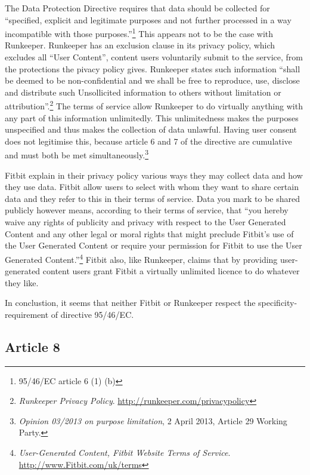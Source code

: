 \documentclass{article}
\begin{document}
The Data Protection Directive requires that data should be collected for ``specified, explicit and legitimate purposes and not further processed in a way incompatible with those purposes.''\footnote{95/46/EC article 6 (1) (b)}
This appears not to be the case with Runkeeper.
Runkeeper has an exclusion clause in its privacy policy, which excludes all ``User Content'', content users voluntarily submit to the service, from the protections the pivacy policy gives.
Runkeeper states such information ``shall be deemed to be non-confidential and we shall be free to reproduce, use, disclose and distribute such Unsollicited information to others without limitation or attribution''.\footnote{\emph{Runkeeper Privacy Policy}. \url{http://runkeeper.com/privacypolicy}}
The terms of service allow Runkeeper to do virtually anything with any part of this information unlimitedly.
This unlimitedness makes the purposes unspecified and thus makes the collection of data unlawful. Having user consent does not legitimise this, because article 6 and 7 of the directive are cumulative and must both be met simultaneously.\footnote{\emph{Opinion 03/2013 on purpose limitation}, 2 April 2013, Article 29 Working Party.}

Fitbit explain in their privacy policy various ways they may collect data and how they use data.
Fitbit allow users to select with whom they want to share certain data and they refer to this in their terms of service.
Data you mark to be shared publicly however means, according to their terms of service, that ``you hereby waive any rights of publicity and privacy with respect to the User Generated Content and any other legal or moral rights that might preclude Fitbit's use of the User Generated Content or require your permission for Fitbit to use the User Generated Content.''\footnote{\emph{User-Generated Content, Fitbit Website Terms of Service}. \url{http://www.Fitbit.com/uk/terms}}
Fitbit also, like Runkeeper, claims that by providing user-generated content users grant Fitbit a virtually unlimited licence to do whatever they like.

In conclustion, it seems that neither Fitbit or Runkeeper respect the specificity-requirement of directive 95/46/EC.

\subsection{Article 8}
\end{document}
